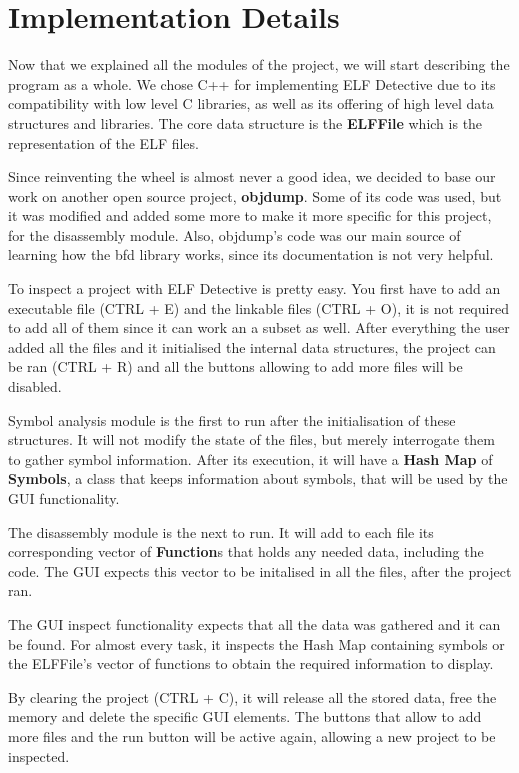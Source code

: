 
\chapter{Implementation Details}
\label{chapter:imp-det}

Now that we explained all the modules of the project, we will start describing the program as a whole. We chose C++ for implementing ELF Detective due to its compatibility with low level C libraries, as well as its offering of high level data structures and libraries. The core data structure is the \textbf{ELFFile} which is the representation of the ELF files.

Since reinventing the wheel is almost never a good idea, we decided to base our work on another open source project, \textbf{objdump}. Some of its code was used, but it was  modified and added some more to make it more specific for this project, for the disassembly module. Also, objdump's code was our main source of learning how the bfd library works, since its documentation is not very helpful.

To inspect a project with ELF Detective is pretty easy. You first have to add an executable file (CTRL + E) and the linkable files (CTRL + O), it is not required to add all of them since it can work an a subset as well. After everything the user added all the files and it initialised the internal data structures, the project can be ran (CTRL + R) and all the buttons allowing to add more files will be disabled.

Symbol analysis module is the first to run after the initialisation of these structures. It will not modify the state of the files, but merely interrogate them to gather symbol information. After its execution, it will have a \textbf{Hash Map} of \textbf{Symbols}, a class that keeps information about symbols, that will be used by the GUI functionality.

The disassembly module is the next to run. It will add to each file its corresponding vector of \textbf{Function}s that holds any needed data, including the code. The GUI expects this vector to be initalised in all the files, after the project ran.

The GUI inspect functionality expects that all the data was gathered and it can be found. For almost every task, it inspects the Hash Map containing symbols or the ELFFile's vector of functions to obtain the required information to display.

By clearing the project (CTRL + C), it will release all the stored data, free the memory and delete the specific GUI elements. The buttons that allow to add more files and the run button will be active again, allowing a new project to be inspected.

